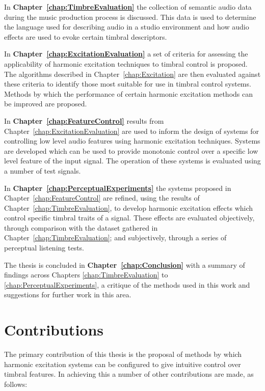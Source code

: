 	In {\bf{Chapter~\ref{chap:TimbreEvaluation}}} the collection of semantic audio data during the music production
	process is discussed. This data is used to determine the language used for describing audio in a studio environment
	and how audio effects are used to evoke certain timbral descriptors.

	In {\bf{Chapter~\ref{chap:ExcitationEvaluation}}} a set of criteria for assessing the applicability of harmonic
	excitation techniques to timbral control is proposed. The algorithms described in Chapter~\ref{chap:Excitation} are
	then evaluated against these criteria to identify those most suitable for use in timbral control systems.  Methods
	by which the performance of certain harmonic excitation methods can be improved are proposed.

	In {\bf{Chapter~\ref{chap:FeatureControl}}} results from Chapter~\ref{chap:ExcitationEvaluation} are used to inform
	the design of systems for controlling low level audio features using harmonic excitation techniques. Systems are
	developed which can be used to provide monotonic control over a specific low level feature of the input signal. The
	operation of these systems is evaluated using a number of test signals.

	In {\bf{Chapter~\ref{chap:PerceptualExperiments}}} the systems proposed in Chapter~\ref{chap:FeatureControl} are
	refined, using the results of Chapter~\ref{chap:TimbreEvaluation}, to develop harmonic excitation effects which
	control specific timbral traits of a signal. These effects are evaluated objectively, through comparison with the
	dataset gathered in Chapter~\ref{chap:TimbreEvaluation}; and subjectively, through a series of perceptual listening
	tests.

	The thesis is concluded in {\bf{Chapter~\ref{chap:Conclusion}}} with a summary of findings across Chapters
	\ref{chap:TimbreEvaluation} to \ref{chap:PerceptualExperiments}, a critique of the methods used in this work and
	suggestions for further work in this area.

\section{Contributions}
\label{sec:Introduction-Contributions}
	The primary contribution of this thesis is the proposal of methods by which harmonic excitation systems can be
	configured to give intuitive control over timbral features. In achieving this a number of other contributions are
	made, as follows:

